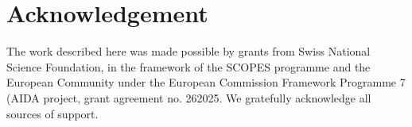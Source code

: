 \documentclass[a4paper,11pt]{article}
\begin{document}
\section*{Acknowledgement}
The work described here was made possible by grants from Swiss National Science Foundation, in the framework of the SCOPES programme and the European Community
under the European Commission Framework Programme 7 (AIDA project, grant agreement no. 262025. We gratefully acknowledge all sources of support.




\end{document}
